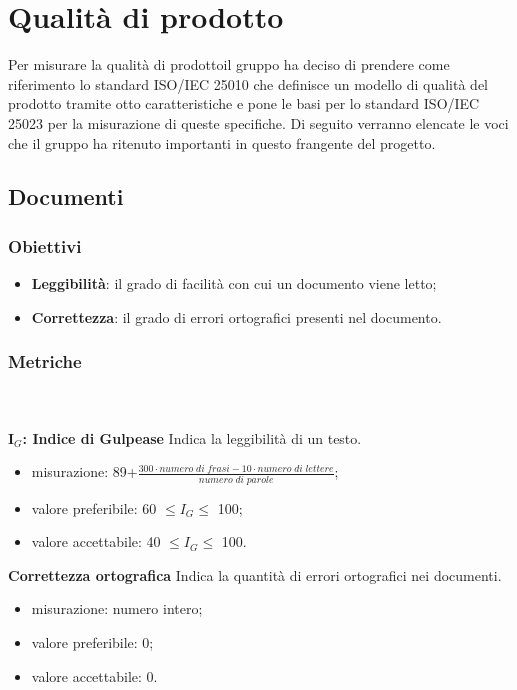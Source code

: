 \section{Qualità di prodotto}
    Per misurare la qualità di prodotto\glosp il gruppo ha deciso di prendere come riferimento lo standard ISO/IEC 25010 che definisce un modello di qualità del prodotto tramite otto caratteristiche e pone le basi per lo standard ISO/IEC 25023 per la misurazione di queste specifiche. Di seguito verranno elencate le voci che il gruppo ha ritenuto importanti in questo frangente del progetto\glo.
    \subsection{Documenti}
    	\subsubsection{Obiettivi}
    		\begin{itemize}
    			\item \textbf{Leggibilità}: il grado di facilità con cui un documento viene letto;
    			\item \textbf{Correttezza}: il grado di errori ortografici presenti nel documento.
    		\end{itemize}
	    \subsubsection{Metriche} \mbox{} \\ \\
	    \textbf{I$_{G}$: Indice di Gulpease} Indica la leggibilità di un testo.
	    \begin{itemize}
	    	\item misurazione: 89+$\frac{300\cdot numero \; di \; frasi-10\cdot numero \; di \; lettere}{numero \; di \; parole}$;
	    	\item valore preferibile: 60 $\le I_{G} \le$ 100;
	    	\item valore accettabile: 40 $\le I_{G} \le$ 100.
	    \end{itemize}
	    \textbf{Correttezza ortografica} Indica la quantità di errori ortografici nei documenti.
	    \begin{itemize}
	    	\item misurazione: numero intero;
	    	\item valore preferibile: 0;
	    	\item valore accettabile: 0.
	    \end{itemize}
